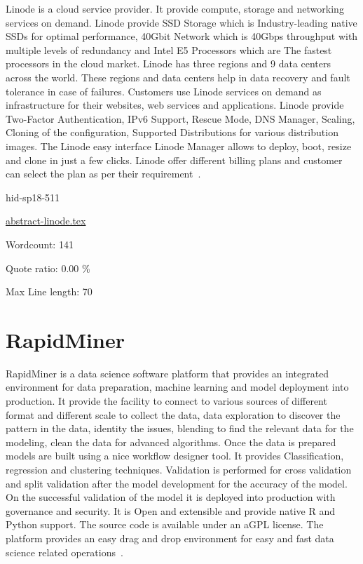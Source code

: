 Linode is a cloud service provider. It provide compute, storage and
networking services on demand. Linode provide SSD Storage which is
Industry-leading native SSDs for optimal performance, 40Gbit Network
which is 40Gbps throughput with multiple levels of redundancy and
Intel E5 Processors which are The fastest processors in the cloud
market. Linode has three regions and 9 data centers across the world.
These regions and data centers help in data recovery and fault
tolerance in case of failures. Customers use Linode services on demand
as infrastructure for their websites, web services and applications.
Linode provide Two-Factor Authentication, IPv6 Support, Rescue Mode, DNS Manager, Scaling, Cloning of the
configuration, Supported Distributions for various distribution
images. The Linode easy interface Linode Manager
allows to deploy, boot, resize and clone in just a few clicks. Linode
offer different billing plans and customer can select the plan as per
their requirement~\cite{hid-sp18-511-linode}.


\begin{IU}

hid-sp18-511

\href{https://github.com/cloudmesh-community/hid-sp18-511/blob/master//technology/abstract-linode.tex}{abstract-linode.tex}

 

Wordcount: 141


Quote ratio: 0.00 \%
 
Max Line length: 70
\end{IU}

\section{RapidMiner}

RapidMiner is a data science software platform that provides an
integrated environment for data preparation, machine
learning and model deployment into production.
It provide the facility to connect to various sources of different
format and different scale to collect the data, data exploration to
discover the pattern in the data, identity the issues, blending to
find the relevant data for the modeling, clean the data for advanced
algorithms. Once the data is prepared models are built using a nice
workflow designer tool. It provides Classification, regression and
clustering techniques. Validation is performed for cross validation
and split validation after the model development for the accuracy of
the model. On the successful validation of the model it is deployed
into production with governance and security. It is Open and
extensible and provide native R and Python support. The source code is
available under an aGPL license. The platform provides an easy drag
and drop environment for easy and fast data science related
operations~\cite{hid-sp18-511-rapidminer}.


